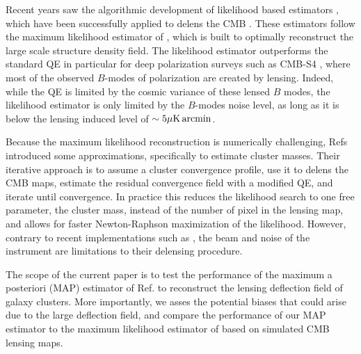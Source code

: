 \documentclass[prd, superscriptaddress, tightenlines, longbibliography, nofootinbib, eqsecnum, amsfonts, amsmath, floatfix, twocolumn, notitlepage]{revtex4-2}
\begin{document}
Recent years saw the algorithmic development of likelihood based estimators \cite{Carron:2017mqf,Millea:2017fyd,Millea:2020cpw, Millea:2021had,Legrand:2021qdu,Legrand:2023jne,Reinecke:2023gtp}, which have been successfully applied to delens the CMB \cite{Millea:2021had,Aurlien:2022tlp}. 
These estimators follow the maximum likelihood estimator of \cite{Hirata:2002jy, Hirata:2003ka}, which is built to optimally reconstruct the large scale structure density field. 
The likelihood estimator outperforms the standard QE in particular for deep polarization surveys such as CMB-S4 \cite{CMB-S4:2016ple}, where most of the observed $B$-modes of polarization are created by lensing. Indeed, while the QE is limited by the cosmic variance of these lensed $B$ modes, the likelihood estimator is only limited by the $B$-modes noise level, as long as it is below the lensing induced level of $\sim 5\mu\rm K \, arcmin$. 

Because the maximum likelihood reconstruction is numerically challenging, Refs \cite{ Yoo:2008bf, Yoo:2010jd} introduced some approximations, specifically to estimate cluster masses. Their iterative approach is to assume a cluster convergence profile, use it to delens the CMB maps, estimate the residual convergence field with a modified QE, and iterate until convergence. In practice this reduces the likelihood search to one free parameter, the cluster mass, instead of the number of pixel in the lensing map, and allows for faster Newton-Raphson maximization of the likelihood. However, contrary to recent implementations such as \cite{Carron:2017mqf}, the beam and noise of the instrument are limitations to their delensing procedure.


The scope of the current paper is to test the performance of the maximum a posteriori (MAP) estimator of Ref. \cite{Carron:2017mqf} to reconstruct the lensing deflection field of galaxy clusters. More importantly, we asses the potential biases that could arise due to the large deflection field, and compare the performance of our MAP estimator to the maximum likelihood estimator of \cite{Raghunathan:2017cle} based on simulated CMB lensing maps. 
\end{document}
